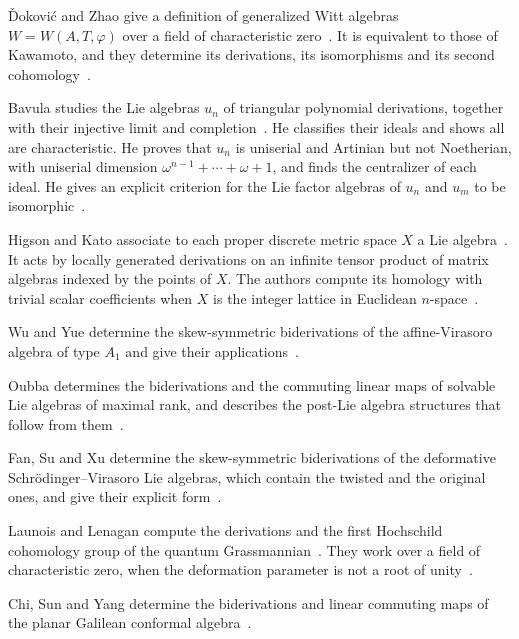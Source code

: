 \v{D}okovi\'c and Zhao give a definition of generalized Witt algebras
$W=W(A,T,\varphi)$ over a field of characteristic zero~\cite{WlDerivationsIsomorphismsAndSeco1998}. It is equivalent to
those of Kawamoto, and they determine its derivations, its isomorphisms and its
second cohomology~\cite{WlDerivationsIsomorphismsAndSeco1998}.

Bavula studies the Lie algebras $u_n$ of triangular polynomial derivations,
together with their injective limit and completion~\cite{WlLieAlgebrasOfTriangularPolynom2012}. He classifies their ideals
and shows all are characteristic. He proves that $u_n$ is uniserial and
Artinian but not Noetherian, with uniserial
dimension $\omega^{n-1}+\cdots+\omega+1$, and finds the centralizer
of each ideal. He gives an explicit criterion for the Lie factor algebras of
$u_n$ and $u_m$ to be isomorphic~\cite{WlLieAlgebrasOfTriangularPolynom2012}.

Higson and Kato associate to each proper discrete metric space $X$ a Lie
algebra~\cite{WlHomologyOfTheLieAlgebraOfLocal2026}. It acts by locally generated derivations on an infinite tensor product
of matrix algebras indexed by the points of $X$. The authors compute its
homology with
trivial scalar coefficients when $X$ is the integer lattice in Euclidean
$n$-space~\cite{WlHomologyOfTheLieAlgebraOfLocal2026}.

Wu and Yue determine the skew-symmetric biderivations of the affine-Virasoro
algebra of type $A_1$ and give their
applications~\cite{WlSkewSymmetricBiderivationsOnTh2022}.

Oubba determines the biderivations and the commuting linear maps of solvable
Lie algebras of maximal rank, and describes the post-Lie algebra structures
that follow from them~\cite{WlBiderivationsCommutingLinearMa2025}.

Fan, Su and Xu determine the skew-symmetric biderivations of the deformative
Schr\"odinger--Virasoro Lie algebras, which contain the twisted and the
original ones, and give their explicit
form~\cite{WlLinearCommutingMapsAndSkewSymm2016}.

Launois and Lenagan compute the derivations and the first Hochschild
cohomology group of the quantum Grassmannian~\cite{WlDerivationsAndTheFirstHochschi2024}. They work over a field of
characteristic
zero, when the deformation parameter is not a root of
unity~\cite{WlDerivationsAndTheFirstHochschi2024}.

Chi, Sun and Yang determine the biderivations and linear commuting maps of the
planar Galilean conformal algebra~\cite{WlBiderivationsAndLinearCommutin2018}.

